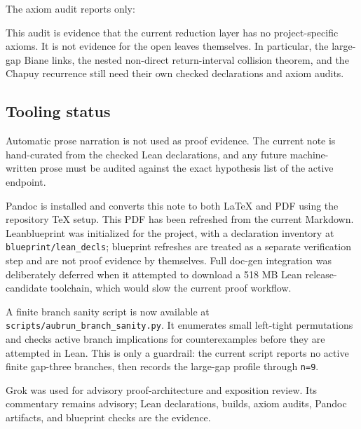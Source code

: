 \documentclass[
]{article}
\newenvironment{Shaded}{}{}
\newcommand{\NormalTok}[1]{#1}
\begin{document}
The axiom audit reports only:

\begin{Shaded}
\begin{Highlighting}[]
\NormalTok{[propext, Classical.choice, Quot.sound]}
\end{Highlighting}
\end{Shaded}

This audit is evidence that the current reduction layer has no
project-specific axioms. It is not evidence for the open leaves
themselves. In particular, the large-gap Biane links, the nested
non-direct return-interval collision theorem, and the Chapuy recurrence
still need their own checked declarations and axiom audits.

\subsection{Tooling status}\label{tooling-status}

Automatic prose narration is not used as proof evidence. The current
note is hand-curated from the checked Lean declarations, and any future
machine-written prose must be audited against the exact hypothesis list
of the active endpoint.

Pandoc is installed and converts this note to both LaTeX and PDF using
the repository TeX setup. This PDF has been refreshed from the current
Markdown. Leanblueprint was initialized for the project, with a
declaration inventory at \texttt{blueprint/lean\_decls}; blueprint
refreshes are treated as a separate verification step and are not proof
evidence by themselves. Full doc-gen integration was deliberately
deferred when it attempted to download a 518 MB Lean release-candidate
toolchain, which would slow the current proof workflow.

A finite branch sanity script is now available at
\texttt{scripts/aubrun\_branch\_sanity.py}. It enumerates small
left-tight permutations and checks active branch implications for
counterexamples before they are attempted in Lean. This is only a
guardrail: the current script reports no active finite gap-three
branches, then records the large-gap profile through \texttt{n=9}.

Grok was used for advisory proof-architecture and exposition review. Its
commentary remains advisory; Lean declarations, builds, axiom audits,
Pandoc artifacts, and blueprint checks are the evidence.
\end{document}
